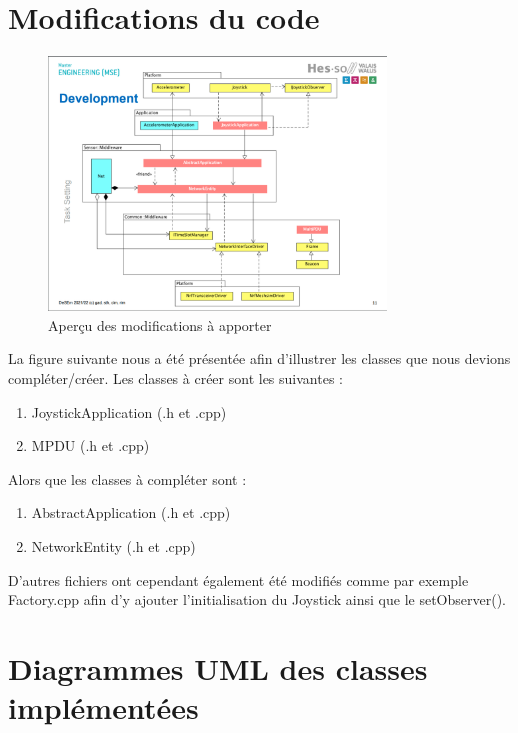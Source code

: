 \documentclass{report}
\begin{document}
\chapter{Modifications du code}
\begin{figure}[H]
    \centering
    \includegraphics[width= 0.8\textwidth]{Images/ClassesToImplement.png}
    \caption{Aperçu des modifications à apporter}
    \label{fig:ClassesToModify}
\end{figure}
La figure suivante nous a été présentée afin d'illustrer les classes que nous devions compléter/créer. Les classes à créer sont les suivantes :
\begin{enumerate}
\item JoystickApplication (.h et .cpp)
\item MPDU (.h et .cpp)
\end{enumerate}
Alors que les classes à compléter sont :
\begin{enumerate}
\item AbstractApplication (.h et .cpp)
\item NetworkEntity (.h et .cpp)
\end{enumerate}
D'autres fichiers ont cependant également été modifiés comme par exemple Factory.cpp afin d'y ajouter l'initialisation du Joystick ainsi que le setObserver().\newline

\chapter{Diagrammes UML des classes implémentées}
\end{document}
